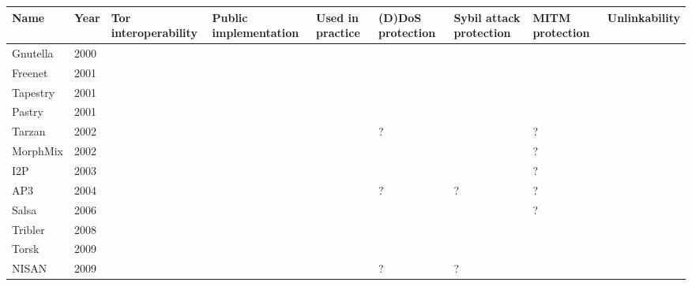 \begin{tabular}[p]{| l | l | p{2.5cm} | p{2.5cm} | p{2.5cm} | p{2.5cm} | p{2.5cm} | p{2.5cm} | p{2.5cm} |}
	\hline
	\textbf{Name} & \textbf{Year} & \textbf{Tor interoperability} & \textbf{Public implementation} & \textbf{Used in \newline practice} & \textbf{(D)DoS protection} & \textbf{Sybil attack protection} & \textbf{MITM \newline protection} & \textbf{Unlinkability} \\ \hline

	Gnutella & 2000 & \xmark & \checkmark & \checkmark & \xmark & \xmark & \xmark & \xmark \\ \hline
	Freenet & 2001 & \xmark & \checkmark & \checkmark & \checkmark & \xmark & \xmark & \checkmark \\ \hline
	Tapestry & 2001 & \xmark & \checkmark & \checkmark & \checkmark & \xmark & \xmark & \xmark \\ \hline
	Pastry & 2001 & \xmark & \checkmark & \checkmark & \checkmark & \xmark & \xmark & \xmark \\ \hline
	Tarzan & 2002 & \xmark & \xmark & \xmark & ? & \checkmark & ? & \checkmark \\ \hline
	MorphMix & 2002 & \xmark & \checkmark & \xmark & \checkmark & \xmark & ? & \checkmark \\ \hline
	I2P & 2003 & \xmark & \checkmark & \checkmark & \checkmark & \checkmark & ? & \checkmark\\ \hline
	AP3 & 2004 & \xmark & \xmark & \xmark & ? & ? & ? & \checkmark \\ \hline
	Salsa & 2006 & \xmark & \xmark & \xmark & \checkmark & \checkmark & ? & \checkmark \\ \hline
	Tribler & 2008 & \xmark & \checkmark & \checkmark & \checkmark & \xmark & \xmark & \xmark \\ \hline
	Torsk & 2009 & \checkmark & \xmark & \xmark & \checkmark & \checkmark & \checkmark & \checkmark \\ \hline
	NISAN & 2009 & \xmark & \xmark & \xmark & ? & ? & \checkmark & \checkmark \\ \hline		
\end{tabular}

